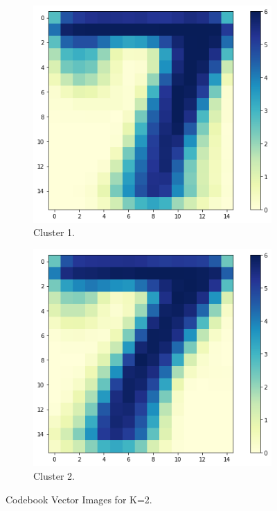 \documentclass{article}
\begin{document}
\begin{figure}[h!]
    \centering
    \begin{subfigure}[b]{0.4\linewidth}
      \includegraphics[scale=0.4]{images/codebook_cluster2_1.png}
      \caption{Cluster 1.}
    \end{subfigure}\hspace{20.0}%
    \begin{subfigure}[b]{0.4\linewidth}
      \includegraphics[scale=0.4]{images/codebook_cluster2_2.png}
      \caption{Cluster 2.}
    \end{subfigure}
    \caption{Codebook Vector Images for K=2.}
    \label{fig:codebook2}
\end{figure}
\end{document}

